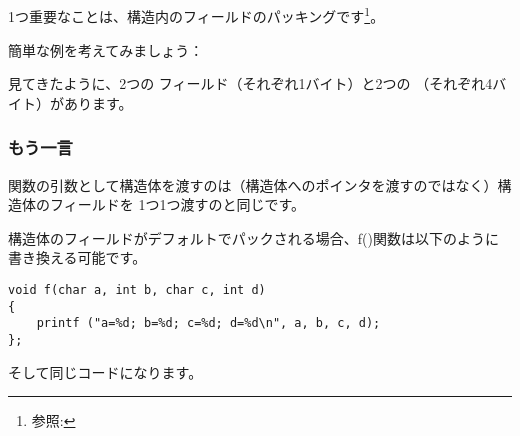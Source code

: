 ﻿\subsection{\StructurePackingSectionName}
\label{structure_packing}

1つ重要なことは、構造内のフィールドのパッキングです\footnote{参照: \URLWPDA}。

簡単な例を考えてみましょう：



見てきたように、2つの \Tchar フィールド（それぞれ1バイト）と2つの \Tint（それぞれ4バイト）があります。





\subsubsection{もう一言}

関数の引数として構造体を渡すのは（構造体へのポインタを渡すのではなく）構造体のフィールドを
1つ1つ渡すのと同じです。

構造体のフィールドがデフォルトでパックされる場合、f()関数は以下のように書き換える可能です。

\begin{lstlisting}[style=customc]
void f(char a, int b, char c, int d)
{
    printf ("a=%d; b=%d; c=%d; d=%d\n", a, b, c, d);
};
\end{lstlisting}

そして同じコードになります。
